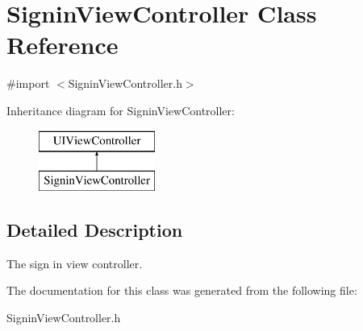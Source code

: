 \hypertarget{interface_signin_view_controller}{\section{Signin\+View\+Controller Class Reference}
\label{interface_signin_view_controller}
}


{\ttfamily \#import $<$Signin\+View\+Controller.\+h$>$}

Inheritance diagram for Signin\+View\+Controller\+:\begin{figure}[H]
\begin{center}
\leavevmode
\includegraphics[height=2.000000cm]{interface_signin_view_controller}
\end{center}
\end{figure}


\subsection{Detailed Description}
The sign in view controller. 

The documentation for this class was generated from the following file\+:\begin{DoxyCompactItemize}
\item 
Signin\+View\+Controller.\+h\end{DoxyCompactItemize}
